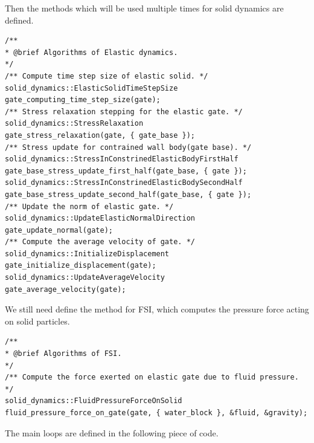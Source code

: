 \documentclass[12pt, a4paper,onecolumn]{article}
\begin{document}
Then the methods which will be used multiple times for solid dynamics are defined.
%
\begin{lstlisting}[basicstyle=\ttfamily\footnotesize]
/**
* @brief Algorithms of Elastic dynamics.
*/
/** Compute time step size of elastic solid. */
solid_dynamics::ElasticSolidTimeStepSize 	gate_computing_time_step_size(gate);
/** Stress relaxation stepping for the elastic gate. */
solid_dynamics::StressRelaxation 			gate_stress_relaxation(gate, { gate_base });
/** Stress update for contrained wall body(gate base). */
solid_dynamics::StressInConstrinedElasticBodyFirstHalf 	gate_base_stress_update_first_half(gate_base, { gate });
solid_dynamics::StressInConstrinedElasticBodySecondHalf gate_base_stress_update_second_half(gate_base, { gate });
/** Update the norm of elastic gate. */
solid_dynamics::UpdateElasticNormalDirection 	gate_update_normal(gate);
/** Compute the average velocity of gate. */
solid_dynamics::InitializeDisplacement 			gate_initialize_displacement(gate);
solid_dynamics::UpdateAverageVelocity 			gate_average_velocity(gate);
\end{lstlisting}
%
We still need define the method for FSI, which computes the pressure force acting on solid particles.
%
\begin{lstlisting}[basicstyle=\ttfamily\footnotesize]
/**
* @brief Algorithms of FSI.
*/
/** Compute the force exerted on elastic gate due to fluid pressure. */
solid_dynamics::FluidPressureForceOnSolid 	fluid_pressure_force_on_gate(gate, { water_block }, &fluid, &gravity);
\end{lstlisting}
%
The main loops are defined in the following piece of code.
%
\end{document}
